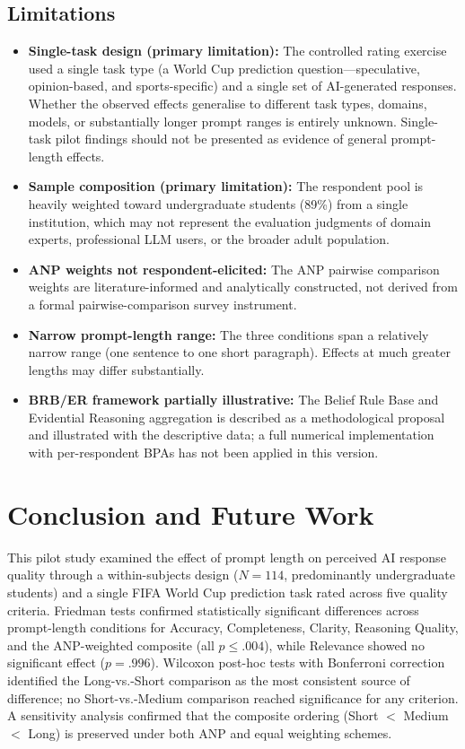 \documentclass[conference]{IEEEtran}
\begin{document}
\subsection{Limitations}
\begin{itemize}
\item \textbf{Single-task design (primary limitation):} The controlled rating exercise used a single task type (a World Cup prediction question---speculative, opinion-based, and sports-specific) and a single set of AI-generated responses. Whether the observed effects generalise to different task types, domains, models, or substantially longer prompt ranges is entirely unknown. Single-task pilot findings should not be presented as evidence of general prompt-length effects.
\item \textbf{Sample composition (primary limitation):} The respondent pool is heavily weighted toward undergraduate students (89\%) from a single institution, which may not represent the evaluation judgments of domain experts, professional LLM users, or the broader adult population.
\item \textbf{ANP weights not respondent-elicited:} The ANP pairwise comparison weights are literature-informed and analytically constructed, not derived from a formal pairwise-comparison survey instrument.
\item \textbf{Narrow prompt-length range:} The three conditions span a relatively narrow range (one sentence to one short paragraph). Effects at much greater lengths may differ substantially.
\item \textbf{BRB/ER framework partially illustrative:} The Belief Rule Base and Evidential Reasoning aggregation is described as a methodological proposal and illustrated with the descriptive data; a full numerical implementation with per-respondent BPAs has not been applied in this version.
\end{itemize}

\section{Conclusion and Future Work}
This pilot study examined the effect of prompt length on perceived AI response quality through a within-subjects design ($N=114$, predominantly undergraduate students) and a single FIFA World Cup prediction task rated across five quality criteria. Friedman tests confirmed statistically significant differences across prompt-length conditions for Accuracy, Completeness, Clarity, Reasoning Quality, and the ANP-weighted composite (all $p \leq .004$), while Relevance showed no significant effect ($p=.996$). Wilcoxon post-hoc tests with Bonferroni correction identified the Long-vs.-Short comparison as the most consistent source of difference; no Short-vs.-Medium comparison reached significance for any criterion. A sensitivity analysis confirmed that the composite ordering (Short $<$ Medium $<$ Long) is preserved under both ANP and equal weighting schemes.
\end{document}
